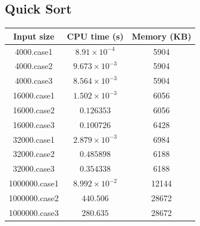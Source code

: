 \documentclass[11pt]{article}
\theoremstyle{definition}
\begin{document}
\subsection*{Quick Sort}
\begin{center}
  \begin{tabular}{|c|c|c|}
    \hline 
    Input size & CPU time (s) & Memory (KB) \\ 
    \hline 
    4000.case1 & $8.91  \times 10^{-4}$ & 5904 \\ 
    \hline
    4000.case2 & $9.673 \times 10^{-3}$ & 5904 \\ 
    \hline
    4000.case3 & $8.564 \times 10^{-3}$ & 5904 \\ 
    \hline
    16000.case1 & $1.502  \times 10^{-3}$ & 6056 \\ 
    \hline 
    16000.case2 & $0.126353$ & 6056 \\ 
    \hline
    16000.case3 & $0.100726$ & 6428 \\ 
    \hline 
    32000.case1 & $2.879\times10^{-3}$ & 6984 \\ 
    \hline 
    32000.case2 & $0.485898$ & 6188 \\ 
    \hline
    32000.case3 & $0.354338$ & 6188 \\
    \hline 
    1000000.case1 & $8.992\times10^{-2}$ & 12144 \\ 
    \hline 
    1000000.case2 & $440.506$ & 28672 \\ 
    \hline 
    1000000.case3 & $280.635$ & 28672 \\
    \hline
  \end{tabular}
\end{center}
\end{document}
